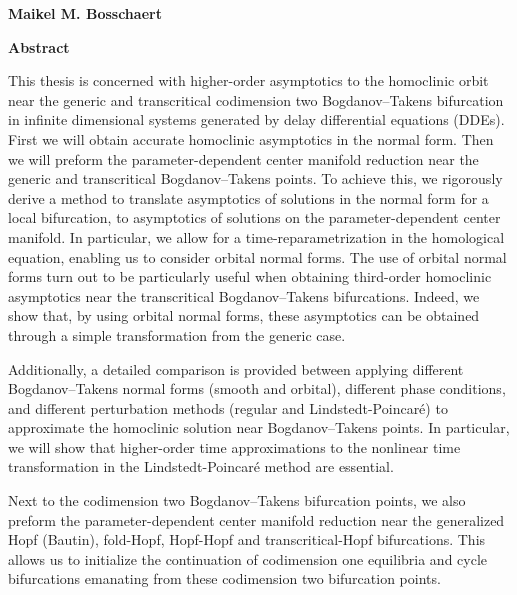 \thispagestyle{plain}
\begin{center}
    \Large
    \textbf{\thesistitle}
        
    \vspace{0.4cm}
    \large
    \thesissubtitle
        
    \vspace{0.4cm}
    \textbf{Maikel M. Bosschaert}
       
    \vspace{0.9cm}
    \textbf{Abstract}
\end{center}
This thesis is concerned with higher-order asymptotics to the homoclinic orbit
near the generic and transcritical codimension two Bogdanov--Takens bifurcation
in infinite dimensional systems generated by delay differential equations (DDEs).
First we will obtain accurate homoclinic asymptotics in the normal form. Then we
will preform the parameter-dependent center manifold reduction near the generic
and transcritical Bogdanov--Takens points. To achieve this, we rigorously derive
a method to translate asymptotics of solutions in the normal form for a local
bifurcation, to asymptotics of solutions on the parameter-dependent center
manifold. In particular, we allow for a time-reparametrization in the homological
equation, enabling us to consider orbital normal forms. The use of orbital normal
forms turn out to be particularly useful when obtaining third-order homoclinic
asymptotics near the transcritical Bogdanov--Takens bifurcations. Indeed, we show
that, by using orbital normal forms, these asymptotics can be obtained through a
simple transformation from the generic case.

Additionally, a detailed comparison is provided between applying different
Bogdanov--Takens normal forms (smooth and orbital), different phase conditions,
and different perturbation methods (regular and Lindstedt-Poincar\'e) to
approximate the homoclinic solution near Bogdanov--Takens points. In particular,
we will show that higher-order time approximations to the nonlinear time
transformation in the Lindstedt-Poincar\'e method are essential. 

Next to the codimension two Bogdanov--Takens bifurcation points, we also preform
the parameter-dependent center manifold reduction near the generalized Hopf
(Bautin), fold-Hopf, Hopf-Hopf and transcritical-Hopf bifurcations. This allows
us to initialize the continuation of codimension one equilibria and cycle
bifurcations emanating from these codimension two bifurcation points.

